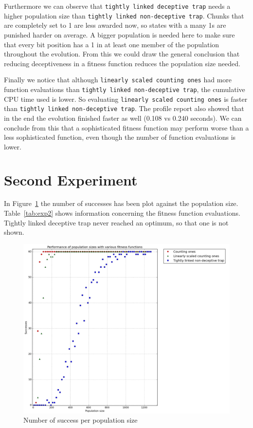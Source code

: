 \documentclass[12pt]{article}
\theoremstyle{definition}
\newcommand{\lsco}{\texttt{linearly scaled counting ones}}
\newcommand{\tdt}{\texttt{tightly linked deceptive trap}}
\newcommand{\tnt}{\texttt{tightly linked non-deceptive trap}}
\begin{document}
Furthermore we can observe that \tdt{} needs a higher population size than \tnt{}.
Chunks that are completely set to 1 are less awarded now,
so states with a many 1s are punished harder on average.
A bigger population is needed here to make sure that every bit position has a 1 in at least one
member of the population throughout the evolution.
From this we could draw the general conclusion that reducing deceptiveness in a fitness function
reduces the population size needed.

Finally we notice that although \lsco{} had more function evaluations than \tnt{},
the cumulative CPU time used is lower.
So evaluating \lsco{} is faster than \tnt{}.
The profile report also showed that in the end the evolution finished faster as well
(0.108 vs 0.240 seconds).
We can conclude from this that a sophisticated fitness function may perform worse than
a less sophisticated function, even though the number of function evaluations is lower.



\section{Second Experiment}
\label{ssec:exp2}
In Figure~\ref{fig:exp2} the number of successes has been plot against the population size.
Table~\ref{tab:exp2} shows information concerning the fitness function evaluations.
Tightly linked deceptive trap never reached an optimum, so that one is not shown.

\begin{figure}[!htb]
    \centering
    \includegraphics[totalheight=0.7\textheight]{images/exp2.png}
    \caption{Number of success per population size}
\label{fig:exp2}
\end{figure}
\end{document}

